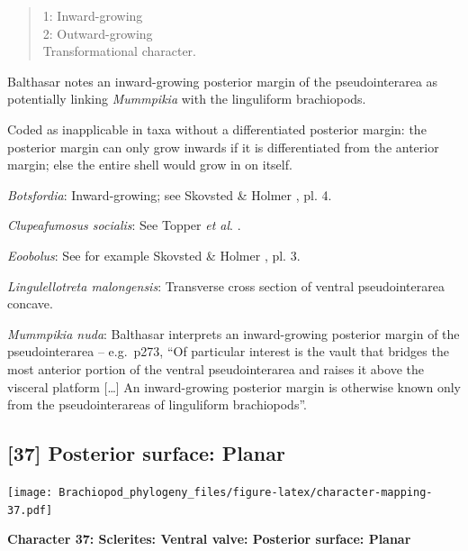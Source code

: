 \documentclass[openany]{book}
\theoremstyle{definition}
\theoremstyle{definition}
\theoremstyle{definition}
\theoremstyle{remark}
\begin{document}
\begin{quote}
1: Inward-growing\\
2: Outward-growing\\
Transformational character.
\end{quote}

Balthasar \citeyearpar{Balthasar2008iMummpikia} notes an inward-growing
posterior margin of the pseudointerarea as potentially linking
\emph{Mummpikia} with the linguliform brachiopods.

Coded as inapplicable in taxa without a differentiated posterior margin:
the posterior margin can only grow inwards if it is differentiated from
the anterior margin; else the entire shell would grow in on itself.

\hypertarget{Botsfordia-coding-36}{}
\emph{Botsfordia}: Inward-growing; see Skovsted \& Holmer
\citeyearpar{Skovsted2005EarlyCambrian}, pl. 4.

\hypertarget{Clupeafumosus_socialis-coding-36}{}
\emph{Clupeafumosus socialis}: See Topper \emph{et al}.
\citeyearpar{Topper2013Reappraisalof}.

\hypertarget{Eoobolus-coding-36}{}
\emph{Eoobolus}: See for example Skovsted \& Holmer
\citeyearpar{Skovsted2005EarlyCambrian}, pl. 3.

\hypertarget{Lingulellotreta_malongensis-coding-36}{}
\emph{Lingulellotreta malongensis}: Transverse cross section of ventral
pseudointerarea concave.

\hypertarget{Mummpikia_nuda-coding-36}{}
\emph{Mummpikia nuda}: Balthasar \citeyearpar{Balthasar2008iMummpikia}
interprets an inward-growing posterior margin of the pseudointerarea --
e.g.~p273, ``Of particular interest is the vault that bridges the most
anterior portion of the ventral pseudointerarea and raises it above the
visceral platform {[}\ldots{}{]} An inward-growing posterior margin is
otherwise known only from the pseudointerareas of linguliform
brachiopods''.

\subsection*{{[}37{]} Posterior surface:
Planar}\label{posterior-surface-planar}

\texttt{[image: Brachiopod\_phylogeny\_files/figure-latex/character-mapping-37.pdf]}

\textbf{Character 37: Sclerites: Ventral valve: Posterior surface:
Planar}
\end{document}
